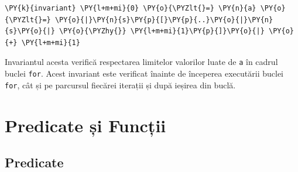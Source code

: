 \begin{sloppypar}
\begin{itemize}
    \begin{Verbatim}[commandchars=\\\{\}]
\PY{k}{invariant} \PY{l+m+mi}{0} \PY{o}{\PYZlt{}=} \PY{n}{a} \PY{o}{\PYZlt{}=} \PY{o}{|}\PY{n}{s}\PY{p}{[}\PY{p}{..}\PY{o}{|}\PY{n}{s}\PY{o}{|} \PY{o}{\PYZhy{}} \PY{l+m+mi}{1}\PY{p}{]}\PY{o}{|} \PY{o}{+} \PY{l+m+mi}{1}
\end{Verbatim}
    Invariantul acesta verifică respectarea limitelor valorilor luate de \texttt{a} în cadrul buclei \texttt{for}. Acest invariant este verificat înainte de începerea executării buclei \texttt{for}, cât și pe parcursul fiecărei iterații și după ieșirea din buclă.
\end{itemize}

\section{Predicate și Funcții}

\subsection{Predicate}


\end{sloppypar}
